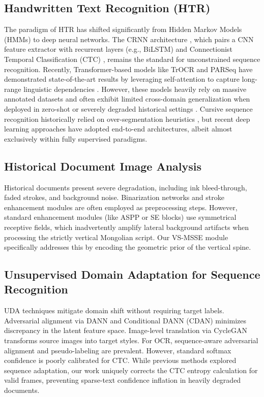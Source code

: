 \documentclass[11pt]{article}
\begin{document}
\subsection{Handwritten Text Recognition (HTR)}
The paradigm of HTR has shifted significantly from Hidden Markov Models (HMMs) \cite{marti2001using} to deep neural networks. The CRNN architecture \cite{shi2016end}, which pairs a CNN feature extractor with recurrent layers (e.g., BiLSTM) and Connectionist Temporal Classification (CTC) \cite{graves2006connectionist}, remains the standard for unconstrained sequence recognition. Recently, Transformer-based models like TrOCR \cite{li2021trocr} and PARSeq \cite{bautista2022parseq} have demonstrated state-of-the-art results by leveraging self-attention to capture long-range linguistic dependencies \cite{kang2022pay, souibgui2022few}. However, these models heavily rely on massive annotated datasets and often exhibit limited cross-domain generalization when deployed in zero-shot or severely degraded historical settings \cite{coquenet2023dan}. Cursive sequence recognition historically relied on over-segmentation heuristics \cite{marti2001using}, but recent deep learning approaches \cite{shi2018aster, bhunia2021meta} have adopted end-to-end architectures, albeit almost exclusively within fully supervised paradigms.

\subsection{Historical Document Image Analysis}
Historical documents present severe degradation, including ink bleed-through, faded strokes, and background noise. Binarization networks \cite{kang2020complex} and stroke enhancement modules \cite{tensmeyer2017document} are often employed as preprocessing steps. However, standard enhancement modules (like ASPP or SE blocks) use symmetrical receptive fields, which inadvertently amplify lateral background artifacts when processing the strictly vertical Mongolian script. Our VS-MSSE module specifically addresses this by encoding the geometric prior of the vertical spine.

\subsection{Unsupervised Domain Adaptation for Sequence Recognition}
UDA techniques mitigate domain shift without requiring target labels. Adversarial alignment via DANN \cite{ganin2015unsupervised} and Conditional DANN (CDAN) \cite{long2018conditional} minimizes discrepancy in the latent feature space. Image-level translation via CycleGAN \cite{zhu2017unpaired, hoffman2018cycada} transforms source images into target styles. For OCR, sequence-aware adversarial alignment \cite{zhang2019sequence} and pseudo-labeling \cite{zhao2020unsupervised, fang2021read} are prevalent. However, standard softmax confidence is poorly calibrated for CTC. While previous methods \cite{zhang2019sequence, chen2021text} explored sequence adaptation, our work uniquely corrects the CTC entropy calculation for valid frames, preventing sparse-text confidence inflation in heavily degraded documents.
\end{document}
